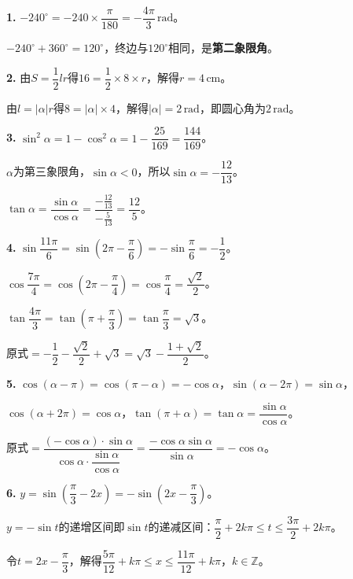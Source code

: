 \documentclass[12pt, a4paper]{ctexart}
\begin{document}
\vspace{1cm}
\begin{knowledgebox}[参考答案]

\textbf{1.} $-240^\circ=-240\times\dfrac{\pi}{180}=-\dfrac{4\pi}{3}\,\text{rad}$。

$-240^\circ+360^\circ=120^\circ$，终边与$120^\circ$相同，是\textbf{第二象限角}。

\medskip

\textbf{2.} 由$S=\dfrac{1}{2}lr$得$16=\dfrac{1}{2}\times8\times r$，解得$r=4\,\text{cm}$。

由$l=|\alpha|r$得$8=|\alpha|\times4$，解得$|\alpha|=2\,\text{rad}$，即圆心角为$2\,\text{rad}$。

\medskip

\textbf{3.} $\sin^2\alpha=1-\cos^2\alpha=1-\dfrac{25}{169}=\dfrac{144}{169}$。

$\alpha$为第三象限角，$\sin\alpha<0$，所以$\sin\alpha=-\dfrac{12}{13}$。

$\tan\alpha=\dfrac{\sin\alpha}{\cos\alpha}=\dfrac{-\frac{12}{13}}{-\frac{5}{13}}=\dfrac{12}{5}$。

\medskip

\textbf{4.} $\sin\dfrac{11\pi}{6}=\sin\!\left(2\pi-\dfrac{\pi}{6}\right)=-\sin\dfrac{\pi}{6}=-\dfrac{1}{2}$。

$\cos\dfrac{7\pi}{4}=\cos\!\left(2\pi-\dfrac{\pi}{4}\right)=\cos\dfrac{\pi}{4}=\dfrac{\sqrt{2}}{2}$。

$\tan\dfrac{4\pi}{3}=\tan\!\left(\pi+\dfrac{\pi}{3}\right)=\tan\dfrac{\pi}{3}=\sqrt{3}$。

原式$=-\dfrac{1}{2}-\dfrac{\sqrt{2}}{2}+\sqrt{3}=\sqrt{3}-\dfrac{1+\sqrt{2}}{2}$。

\medskip

\textbf{5.} $\cos(\alpha-\pi)=\cos(\pi-\alpha)=-\cos\alpha$，$\sin(\alpha-2\pi)=\sin\alpha$，

$\cos(\alpha+2\pi)=\cos\alpha$，$\tan(\pi+\alpha)=\tan\alpha=\dfrac{\sin\alpha}{\cos\alpha}$。

原式$=\dfrac{(-\cos\alpha)\cdot\sin\alpha}{\cos\alpha\cdot\dfrac{\sin\alpha}{\cos\alpha}}=\dfrac{-\cos\alpha\sin\alpha}{\sin\alpha}=-\cos\alpha$。

\medskip

\textbf{6.} $y=\sin\!\left(\dfrac{\pi}{3}-2x\right)=-\sin\!\left(2x-\dfrac{\pi}{3}\right)$。

$y=-\sin t$的递增区间即$\sin t$的递减区间：$\dfrac{\pi}{2}+2k\pi\leqslant t\leqslant\dfrac{3\pi}{2}+2k\pi$。

令$t=2x-\dfrac{\pi}{3}$，解得$\dfrac{5\pi}{12}+k\pi\leqslant x\leqslant\dfrac{11\pi}{12}+k\pi$，$k\in\mathbb{Z}$。


\end{knowledgebox}
\end{document}
